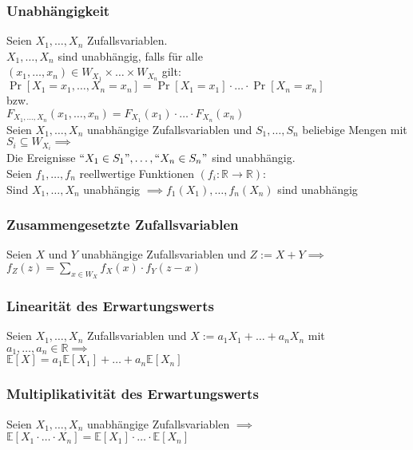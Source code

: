 \documentclass[a4paper,9pt]{extarticle}
\begin{document}
\subsubsection*{Unabhängigkeit}
Seien $X_1, \dots, X_n$ Zufallsvariablen. \\
$X_1, \dots, X_n$ sind unabhängig, falls für alle \\
$(x_1, \dots, x_n) \in W_{X_1} \times \dots \times W_{X_n}$ gilt: \\
$\Pr[X_1 = x_1, \dots, X_n = x_n] = \Pr[X_1 = x_1] ⋅ \dots ⋅ \Pr[X_n = x_n]$ \\
bzw. \\
$F_{X_1, \dots, X_n} (x_1, \dots, x_n) = F_{X_1}(x_1) ⋅ \dots ⋅ F_{X_n}(x_n)$ \\

Seien $X_1, \dots, X_n$ unabhängige Zufallsvariablen und $S_1, \dots, S_n$ beliebige Mengen mit $S_i \subseteq W_{X_i} \implies$ \\
Die Ereignisse $``X_1 \in S_1", \dots, ``X_n \in S_n"$ sind unabhängig. \\

Seien $f_1, \dots, f_n$ reellwertige Funktionen $(f_i : \mathbb{R} → \mathbb{R})$: \\
Sind $X_1, \dots, X_n$ unabhängig $\implies f_1(X_1), \dots, f_n(X_n)$ sind unabhängig

\subsubsection*{Zusammengesetzte Zufallsvariablen}
Seien $X$ und $Y$ unabhängige Zufallsvariablen und $Z := X + Y \implies$ \\
$f_Z(z) = \sum_{x \in W_X} f_X(x) ⋅ f_Y(z-x)$

\subsubsection*{Linearität des Erwartungswerts}
Seien $X_1, \dots, X_n$ Zufallsvariablen und $X := a_1 X_1 + \dots + a_n X_n$ mit $a_1, \dots, a_n \in \mathbb{R} \implies$ \\
$\mathbb{E}[X] = a_1 \mathbb{E}[X_1] + \dots + a_n \mathbb{E}[X_n]$

\subsubsection*{Multiplikativität des Erwartungswerts}
Seien $X_1, \dots, X_n$ unabhängige Zufallsvariablen $\implies$ \\
$\mathbb{E}[X_1 ⋅ \dots ⋅ X_n] = \mathbb{E}[X_1] ⋅ \dots ⋅ \mathbb{E}[X_n]$
\end{document}
